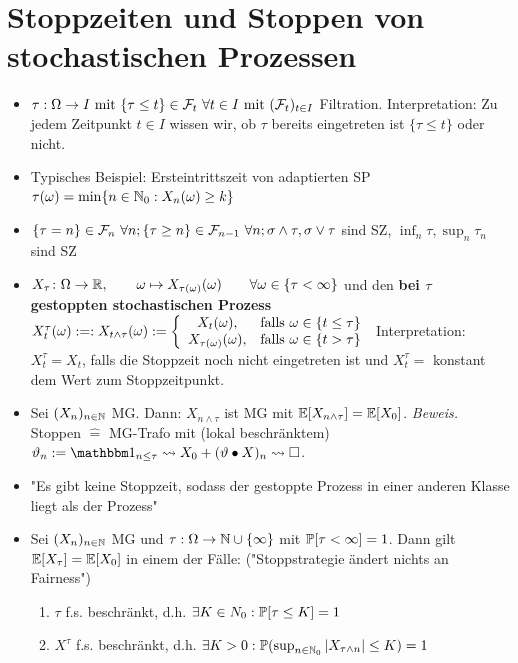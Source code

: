 \documentclass[12pt]{scrartcl}
\begin{document}
	\section{Stoppzeiten und Stoppen von stochastischen Prozessen}
	\begin{itemize}
		\item {} $\tau:\Omega\to I\mit\lbrace \tau\leq t\rbrace\in\F_t~\forall t\in I\mit (\F_t)_{t\in I}$ Filtration.
		Interpretation: Zu jedem Zeitpunkt $t\in I$ wissen wir, ob $\tau$ bereits eingetreten ist $\lbrace\tau\leq t\rbrace$ oder nicht.
		\item Typisches Beispiel: Ersteintrittszeit von adaptierten SP $\tau(\omega)=\min\lbrace n\in\N_0:X_n(\omega)\geq k\rbrace$
		\item $\lbrace \tau=n\rbrace\in\F_n~\forall n;\lbrace \tau\geq n\rbrace\in\F_{n-1}~\forall n;\sigma\wedge\tau,\sigma\vee\tau$ sind SZ, $\inf_n\tau,\sup_n\tau_n$ sind SZ
		\item $X_\tau\colon\Omega\to\R,\qquad \omega\mapsto X_{\tau(\omega)}(\omega)\qquad\forall \omega\in\lbrace\tau<\infty\rbrace$
	und den \textbf{bei $\tau$ gestoppten stochastischen Prozess}
	$X_t^\tau(\omega):=:X_{t\wedge\tau}(\omega):=\left\lbrace\begin{array}{cl}
			X_t(\omega), & \falls \omega\in\lbrace t\leq\tau\rbrace\\
			X_{\tau(\omega)}(\omega), &\falls\omega\in\lbrace t>\tau\rbrace
		\end{array}\right.$
		Interpretation: $X_t^\tau=X_t$, falls die Stoppzeit noch nicht eingetreten ist und $X_t^\tau=$ konstant dem Wert zum Stoppzeitpunkt.
		\item Sei $(X_n)_{n\in\N}$ MG. Dann: $X_{n\wedge\tau}$ ist MG mit $\E[X_{n\wedge\tau}]=\E[X_0]$. \textit{Beweis.} Stoppen $\hat{=}$ MG-Trafo mit (lokal beschränktem) $\vartheta_{n}:=\indi_{n\leq\tau}\leadsto X_0+(\vartheta\bullet X)_n\leadsto\square$.
		\item "Es gibt keine Stoppzeit, sodass der gestoppte Prozess in einer anderen Klasse liegt als der Prozess" %
		\item {} Sei $(X_n)_{n\in\N}$ MG und $\tau:\Omega\to\N\cup\lbrace\infty\rbrace$ mit $\P[\tau<\infty]=1$. 
		Dann gilt $\E[X_\tau]=\E[X_0]$ in einem der Fälle: ("Stoppstrategie ändert nichts an Fairness")
		\begin{enumerate}
			\item $\tau$ f.s. beschränkt, d.h. $\exists K\in N_0:\P[\tau\leq K]=1$
			\item $X^\tau$ f.s. beschränkt, d.h. $\exists K>0:\P(\sup_{n\in\N_0}|X_{\tau\wedge n}|\leq K)=1$

\end{enumerate}
\end{itemize}
\end{document}
